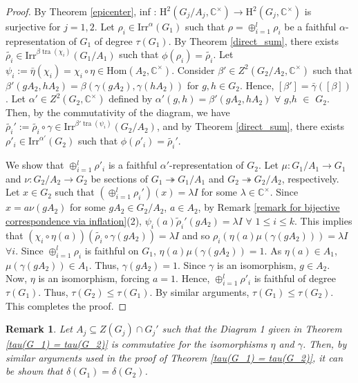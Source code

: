 \documentclass[a4paper,11pt]{amsart}
\numberwithin{equation}{section}
\numberwithin{equation}{subsection}
\newtheorem{remark}[theorem]{Remark}
\newcommand{\C}{\mathbb{C}}
\newcommand{\irr}{\mathrm{Irr}}
\newcommand{\Hom}{\mathrm{Hom}}
\newcommand{\tra}{\operatorname{tra}}
\newcommand{\poonam}[1]{{\color{blue} #1}}
\begin{document}
	\begin{proof}
		By Theorem \ref{epicenter}, inf : $\mathrm{H}^2(G_j/A_j, \mathbb{C}^{\times}) \rightarrow\mathrm{H}^2(G_j,\mathbb{C}^{\times})$ is surjective for $j=1, 2$. Let $\rho_i \in \irr^{\alpha}(G_1)$ such that $\rho= \oplus_{i=1}^l \rho_i$ be a faithful $\alpha$-representation of $G_1$ of degree $\tau(G_1)$. By Theorem \ref{direct_sum}, there exists $\tilde{\rho_i} \in \irr^{\beta\tra(\chi_i)}(G_1/A_1)$ such that $\phi(\rho_i)= \tilde{\rho_i} $. Let $\psi_i:= \bar{\eta} (\chi_i)= \chi_i \circ \eta \in \Hom(A_2, \C^\times)$.  
		Consider $\beta'\in Z^2( G_2/A_2, \C^\times)$ such that $\beta'(gA_2,hA_2)= \beta(\gamma(gA_2), \gamma(hA_2))$ for $g,h \in G_2$. Hence, $[\beta']= \bar{\gamma}([\beta])$. Let $\alpha' \in Z^2(G_2,\C^\times)$ defined by $\alpha'(g,h)= \beta'(gA_2,hA_2)$ $\forall$ $g$,$h$ $\in$ $G_2$. Then, by the commutativity of the diagram, we have $\tilde{\rho_i}':= \tilde{\rho_i} \circ \gamma \in \irr^{\beta'\tra(\psi_i)}(G_2/A_2)$, and by Theorem \ref{direct_sum}, there exists $\rho'_i \in \irr^{\alpha'}(G_2)$ such that $\phi(\rho'_i)= \tilde{\rho_i}'$. %
		
		We show that $\oplus_{i=1}^l \rho'_i$ is a faithful $\alpha'$-representation of $G_2$.
		Let $\mu: G_1/A_1 \to G_1$ and $\nu: G_2/A_2 \to G_2$ be sections of $G_1 \twoheadrightarrow G_1/A_1$ and $G_2 \twoheadrightarrow G_2/A_2$, respectively.
		Let $x \in G_2$ such that $(\oplus_{i=1}^l \rho_i')(x)= \lambda I$ for some $\lambda \in \mathbb{C}^{\times}$. Since $x= a\nu(gA_2)$
		for some $gA_2 \in G_2/A_2$, $a\in A_2$, by Remark \ref{remark for bijective correspondence via inflation}(2), $\psi_i(a) \tilde\rho_i'(gA_2)= \lambda I$ $\forall$ $1 \leq i \leq k$. This implies that $(\chi_i \circ \eta(a))(\tilde{\rho_i} \circ \gamma(gA_2))= \lambda I$ and so $\rho_i(\eta(a)\mu(\gamma(gA_2))) = \lambda I$ $\forall i$. Since $\oplus_{i=1}^l \rho_i$ is faithful on $G_1$, $\eta(a) \mu(\gamma(gA_2))=1$. As $\eta(a) \in A_1$, $\mu(\gamma(gA_2)) \in A_1$. Thus, $\gamma(gA_2) =1$. Since $\gamma$ is an isomorphism, $g \in A_2$. Now, $\eta$ is an isomorphism, forcing $a= 1$. Hence, $\oplus_{i=1}^l \rho'_i$ is faithful of degree $\tau(G_1)$. Thus, $\tau(G_2) \leq \tau(G_1)$. By similar arguments, $\tau(G_1) \leq \tau(G_2)$. This completes the proof. %
	\end{proof}
	
	\begin{remark} Let $A_j \subseteq Z(G_j) \cap G_j'$ such that the Diagram 1 given in Theorem \ref{tau(G_1) = tau(G_2)} is commutative for the isomorphisms $\eta$ and $\gamma$. Then, by similar arguments used in the proof of Theorem \ref{tau(G_1) = tau(G_2)}, it can be shown that $\delta(G_1) = \delta(G_2)$.   
	\end{remark}
\end{document}
